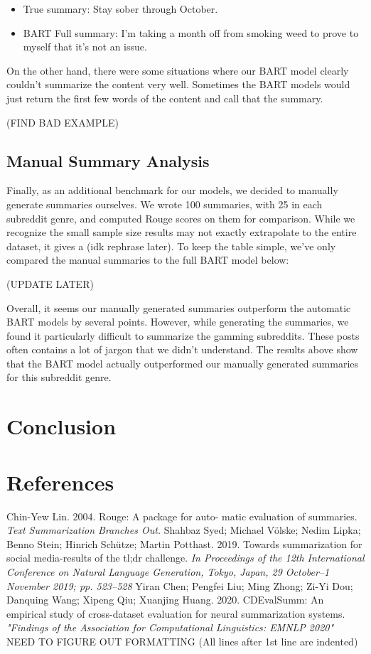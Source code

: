 \documentclass[11pt,a4paper, twocolumn]{article}
\begin{document}
\begin{itemize}
  \item True summary: Stay sober through October.
  \item BART Full summary: I'm taking a month off from smoking weed to prove to myself that it's not an issue.
\end{itemize}


On the other hand, there were some situations where our BART model clearly couldn't summarize the content very well. 
Sometimes the BART models would just return the first few words of the content and call that the summary. 

(FIND BAD EXAMPLE)

\subsection{Manual Summary Analysis}

Finally, as an additional benchmark for our models, we decided to manually generate summaries ourselves. 
We wrote 100 summaries, with 25 in each subreddit genre, and computed Rouge scores on them for comparison. 
While we recognize the small sample size results may not exactly extrapolate to the entire dataset, 
it gives a (idk rephrase later).
To keep the table simple, we've only compared the manual summaries to the full BART model below:

(UPDATE LATER)

Overall, it seems our manually generated summaries outperform the automatic BART models by several points. 
However, while generating the summaries, we found it particularly difficult to summarize the gamming subreddits. 
These posts often contains a lot of jargon that we didn't understand. 
The results above show that the BART model actually outperformed our manually generated summaries for this subreddit genre. 



\section{Conclusion}




\section*{References}
Chin-Yew Lin. 2004. Rouge: A package for auto-
matic evaluation of summaries. \emph{Text Summarization
Branches Out.}
\bigbreak
Shahbaz Syed; Michael Völske; Nedim Lipka; Benno Stein; Hinrich Schütze; Martin Potthast. 2019. Towards summarization for social media-results of the tl;dr
challenge. \emph{In Proceedings of the 12th International Conference on Natural Language Generation, Tokyo, Japan, 29 October–1
November 2019; pp. 523–528}
\bigbreak
Yiran Chen; Pengfei Liu; Ming Zhong; Zi-Yi Dou; Danquing Wang; Xipeng Qiu; Xuanjing Huang. 2020. CDEvalSumm: An empirical study of cross-dataset evaluation
for neural summarization systems. \emph{"Findings of the Association for Computational Linguistics: EMNLP 2020"}
\bigbreak
NEED TO FIGURE OUT FORMATTING (All lines after 1st line are indented)
\end{document}
